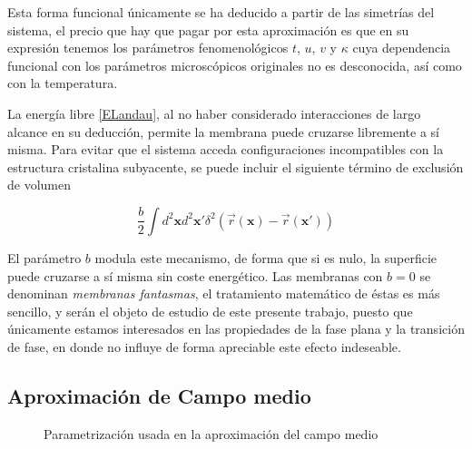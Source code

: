 Esta forma funcional únicamente se ha deducido a partir de las simetrías del
sistema, el precio que hay que pagar por esta aproximación es que en su
expresión tenemos los parámetros fenomenológicos $t$, $u$, $v$ y $\kappa$ cuya
dependencia funcional con los parámetros microscópicos originales no es
desconocida, así como con la temperatura.


La energía libre \eqref{ELandau}, al no haber considerado
interacciones de largo alcance en su deducción, permite la membrana puede
cruzarse libremente a sí misma. Para evitar que el sistema acceda
configuraciones incompatibles con la estructura cristalina subyacente, se
puede incluir el siguiente término de exclusión de volumen

\begin{equation*}
\frac{b}{2}\int d^2\mathbf{x} d^2\mathbf{x'}
\delta^2(\vec{r}(\mathbf{x})-\vec{r}(\mathbf{x'}))
\end{equation*}

El parámetro $b$ modula este mecanismo, de forma que si es nulo, la superficie
puede cruzarse a sí misma sin coste energético. Las membranas con $b=0$ se
denominan \textit{membranas fantasmas}, el tratamiento matemático de éstas es
 más sencillo, y serán el objeto de estudio de este presente
trabajo, puesto que únicamente estamos interesados en las propiedades de la
fase plana y la transición de fase, en donde no influye de forma apreciable
este efecto indeseable. 

\subsection{Aproximación de Campo medio}\label{campo_medio}

\begin{figure}[h]
\centering
 \resizebox{\columnwidth}{!}{}
\caption{Parametrización usada en la aproximación del campo medio}
\end{figure}

